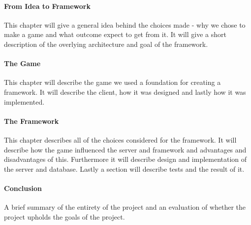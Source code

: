 \paragraph{From Idea to Framework}
This chapter will give a general idea behind the choices made - why we chose to make a game and what outcome expect to get from it. It will give a short description of the overlying architecture and goal of the framework. 
\paragraph{The Game}
This chapter will describe the game we used a foundation for creating a framework. It will describe the client, how it was designed and lastly how it was implemented.
\paragraph{The Framework}
This chapter describes all of the choices considered for the framework. It will describe how the game influenced the server and framework and advantages and disadvantages of this. Furthermore it will describe design and implementation of the server and database. Lastly a section will describe tests and the result of it.
\paragraph{Conclusion}
A brief summary of the entirety of the project and an evaluation of whether the project upholds the goals of the project.